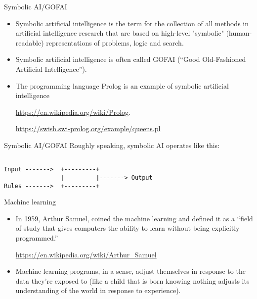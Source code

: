 \documentclass{beamer}
\begin{document}
\begin{frame}{Symbolic AI/GOFAI}
\begin{itemize}
\item Symbolic artificial intelligence is the term for the collection of all methods in artificial intelligence research that are based on high-level "symbolic" (human-readable) representations of problems, logic and search.

\item Symbolic artificial intelligence is often called GOFAI (``Good Old-Fashioned Artificial Intelligence'').

\item The programming language Prolog is an example of symbolic artificial intelligence 

\url{https://en.wikipedia.org/wiki/Prolog}.

\url{https://swish.swi-prolog.org/example/queens.pl}
\end{itemize}
\end{frame}

\begin{frame}[fragile]{Symbolic AI/GOFAI}
Roughly speaking, symbolic AI operates like this:
\begin{verbatim}
                    
Input ------->  +---------+
                |         |-------> Output
Rules ------->  +---------+

\end{verbatim}
\end{frame}

\begin{frame}{Machine learning}
\begin{itemize}
\item In 1959, Arthur Samuel, coined the machine learning and defined it as a ``field of study that gives computers the ability to learn without being explicitly programmed.''

\url{https://en.wikipedia.org/wiki/Arthur_Samuel}

\item Machine-learning programs, in a sense, adjust themselves in response to the data they’re exposed to (like a child that is born knowing nothing adjusts its understanding of the world in response to experience).
\end{itemize}
\end{frame}
\end{document}
